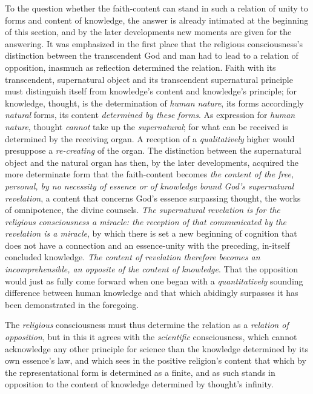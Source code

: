 \documentclass[12pt,a4paper]{book}
\begin{document}
To the question whether the faith-content can stand in such a relation of unity to forms
and content of knowledge, the answer is already intimated at the beginning of this section,
and by the later developments new moments are given for the answering. It was emphasized in
the first place that the religious consciousness's distinction between the transcendent God
and man had to lead to a relation of opposition, inasmuch as reflection determined the
relation. Faith with its transcendent, supernatural object and its transcendent supernatural
principle must distinguish itself from knowledge's content and knowledge's principle; for
knowledge, thought, is the determination of \emph{human nature}, its forms accordingly \emph{natural}
forms, its content \emph{determined by these forms}. As expression for \emph{human nature}, thought \emph{cannot}
take up the \emph{supernatural}; for what can be received is determined by the receiving organ.
A reception of a \emph{qualitatively} higher would presuppose a \emph{re-creating} of the organ. The
distinction between the supernatural object and the natural organ has then, by the later
developments, acquired the more determinate form that the faith-content becomes \emph{the
content of the free, personal, by no necessity of essence or of knowledge bound God's
supernatural revelation}, a content that concerns God's essence surpassing thought, the works
of omnipotence, the divine counsels. \emph{The supernatural revelation is for the religious
consciousness a miracle: the reception of that communicated by the revelation is a miracle},
by which there is set a new beginning of cognition that does not have a connection and an
essence-unity with the preceding, in-itself concluded knowledge. \emph{The content of
revelation therefore becomes an incomprehensible, an opposite of the content of knowledge}.
That the opposition would just as fully come forward when one began with a \emph{quantitatively}
sounding difference between human knowledge and that which abidingly surpasses it has been
demonstrated in the foregoing.

The \emph{religious} consciousness must thus determine the relation as a \emph{relation of opposition}, but
in this it agrees with the \emph{scientific} consciousness, which cannot acknowledge any other
principle for science than the knowledge determined by its own essence's law, and which sees
in the positive religion's content that which by the representational form is determined as a
finite, and as such stands in opposition to the content of knowledge determined by thought's
infinity.
\end{document}
